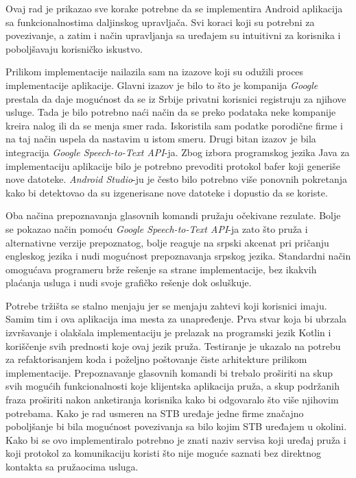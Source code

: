 \documentclass[TamaraIvanovicMasterRad.tex]{subfiles}
\begin{document}
Ovaj rad je prikazao sve korake potrebne da se implementira Android aplikacija sa funkcionalnostima daljinskog upravljača. Svi koraci koji su potrebni za povezivanje, a zatim i način upravljanja sa uređajem su intuitivni za korisnika i poboljšavaju korisničko iskustvo.

Prilikom implementacije nailazila sam na izazove koji su odužili proces implementacije aplikacije. Glavni izazov je bilo to što je kompanija \textit{Google} prestala da daje mogućnost da se iz Srbije privatni korisnici registruju za njihove usluge. Tada je bilo potrebno naći način da se preko podataka neke kompanije kreira nalog ili da se menja smer rada. Iskoristila sam podatke porodične firme i na taj način uspela da nastavim u istom smeru. Drugi bitan izazov je bila integracija \textit{Google Speech-to-Text API}-ja. Zbog izbora programskog jezika Java za implementaciju aplikacije bilo je potrebno prevoditi protokol bafer koji generiše nove datoteke. \textit{Android Studio}-ju je često bilo potrebno više ponovnih pokretanja kako bi detektovao da su izgenerisane nove datoteke i dopustio da se koriste. 

Oba načina prepoznavanja glasovnih komandi pružaju očekivane rezulate. Bolje se pokazao način pomoću \textit{Google Speech-to-Text API}-ja zato što pruža i alternativne verzije prepoznatog, bolje reaguje na srpski akcenat pri pričanju engleskog jezika i nudi mogućnost prepoznavanja srpskog jezika. Standardni način omogućava programeru brže rešenje sa strane implementacije, bez ikakvih plaćanja usluga i nudi svoje grafičko rešenje dok osluškuje. 

Potrebe tržišta se stalno menjaju jer se menjaju zahtevi koji korisnici imaju. Samim tim i ova aplikacija ima mesta za unapređenje. Prva stvar koja bi ubrzala izvršavanje i olakšala implementaciju je prelazak na programski jezik Kotlin i koriščenje svih prednosti koje ovaj jezik pruža. Testiranje je ukazalo na potrebu za refaktorisanjem koda i poželjno poštovanje čiste arhitekture prilikom implementacije. Prepoznavanje glasovnih komandi bi trebalo proširiti na skup svih mogućih funkcionalnosti koje klijentska aplikacija pruža, a skup podržanih fraza proširiti nakon anketiranja korisnika kako bi odgovaralo što više njihovim potrebama. Kako je rad usmeren na STB uređaje jedne firme značajno poboljšanje bi bila mogućnost povezivanja sa bilo kojim STB uređajem u okolini. Kako bi se ovo implementiralo potrebno je znati naziv servisa koji uređaj pruža i koji protokol za komunikaciju koristi što nije moguće saznati bez direktnog kontakta sa pružaocima usluga.
\end{document}

